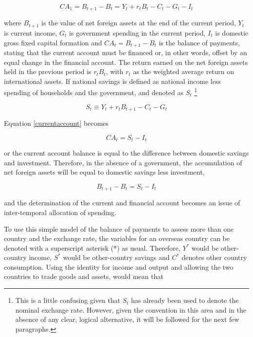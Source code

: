 \documentclass[12pt, a4paper, oneside]{article}\usepackage[]{graphicx}\usepackage[]{color}
\begin{document}
\begin{equation}\label{currentaccount} 
CA_1=B_{t+1}-B_t=Y_t+r_tB_t-C_t-G_t-I_t 
\end{equation} 

\citep[p. 15]{OandR}
where $B_{t+1}$ is the value of net foreign assets at the end of the current period, $Y_t$ is current income, $G_t$ is government spending in the current period, $I_t$ is domestic gross fixed capital formation and $CA_t=B_{t+1}-B_t$ is the balance of payments, stating that the current account must be financed or, in other words, offset by an equal change in the financial account.  The return earned on the net foreign assets held in the previous period is $r_tB_t$, with $r_t$ as the weighted average return on international assets.  If national savings is defined as national income less spending of households and the government, and denoted as $S_t$ \footnote{This is a little confusing given that $S_t$ has already been used to denote the nominal exchange rate.  However, given the convention in this area and in the absence of any clear, logical alternative, it will be followed for the next few paragraphs.} 

\begin{equation} 
S_t \equiv Y_t+r_tB_{t+1}-C_t-G_t 
\end{equation}

Equation \eqref{currentaccount} becomes

\begin{equation}\label{SI} 
CA_t=S_t-I_t 
\end{equation}  

or the current account balance is equal to the difference between domestic savings and investment. 
Therefore, in the absence of a government, the accumulation of net foreign assets will be equal to domestic savings less investment,  

\begin{equation}
 B_{t+1}-B_{t}=S_t-I_t
\end{equation} 

and the determination of the current and financial account becomes an issue of inter-temporal allocation of spending.  

To use this simple model of the balance of payments to assess more than one country and the exchange rate, the variables for an overseas country can be denoted with a superscript asterisk (*) as usual.   Therefore, $Y^*$ would be other-country income, $S^*$ would be other-country savings and $C^*$ denotes other country consumption.  Using the identity for income and output and allowing the two countries to trade goods and assets, would mean that 
\end{document}

